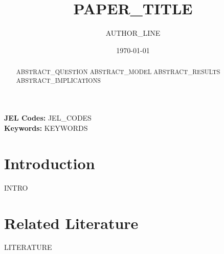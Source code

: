 %
%

\title{ {{PAPER_TITLE}} }
\author{ {{AUTHOR_LINE}} }
\date{\today}


\maketitle

\begin{abstract}
\noindent
{{ABSTRACT_QUESTION}}
{{ABSTRACT_MODEL}}
{{ABSTRACT_RESULTS}}
{{ABSTRACT_IMPLICATIONS}}
\end{abstract}

\textbf{JEL Codes:} {{JEL_CODES}} \\
\textbf{Keywords:} {{KEYWORDS}}

\newpage

\section{Introduction}
\label{sec:introduction}
{{INTRO}}

\section{Related Literature}
\label{sec:literature}
{{LITERATURE}}

